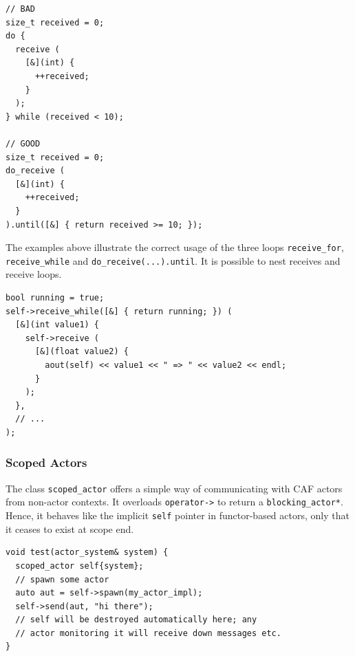 \begin{lstlisting}
// BAD
size_t received = 0;
do {
  receive (
    [&](int) {
      ++received;
    }
  );
} while (received < 10);

// GOOD
size_t received = 0;
do_receive (
  [&](int) {
    ++received;
  }
).until([&] { return received >= 10; });
\end{lstlisting}

The examples above illustrate the correct usage of the three loops \lstinline^receive_for^, \lstinline^receive_while^ and \lstinline^do_receive(...).until^.
It is possible to nest receives and receive loops.

\begin{lstlisting}
bool running = true;
self->receive_while([&] { return running; }) (
  [&](int value1) {
    self->receive (
      [&](float value2) {
        aout(self) << value1 << " => " << value2 << endl;
      }
    );
  },
  // ...
);
\end{lstlisting}

\subsubsection{Scoped Actors}
\label{scoped-actors}

The class \lstinline^scoped_actor^ offers a simple way of communicating with CAF actors from non-actor contexts.
It overloads \lstinline^operator->^ to return a \lstinline^blocking_actor*^.
Hence, it behaves like the implicit \lstinline^self^ pointer in functor-based actors, only that it ceases to exist at scope end.

\begin{lstlisting}
void test(actor_system& system) {
  scoped_actor self{system};
  // spawn some actor
  auto aut = self->spawn(my_actor_impl);
  self->send(aut, "hi there");
  // self will be destroyed automatically here; any
  // actor monitoring it will receive down messages etc.
}
\end{lstlisting}
